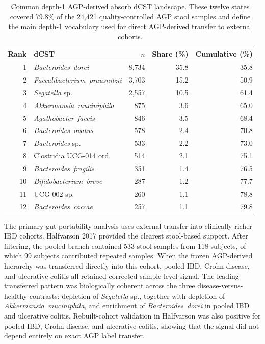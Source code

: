 \documentclass[11pt]{article}
\newcommand{\taxon}[1]{\emph{#1}}
\begin{document}
\begin{table}[H]
\centering
\caption{Common depth-1 AGP-derived absorb dCST landscape. These twelve
states covered 79.8\% of the 24,421 quality-controlled AGP stool samples
and define the main depth-1 vocabulary used for direct AGP-derived
transfer to external cohorts.}
\label{tab:agp-depth1-landscape}
\footnotesize
\renewcommand{\arraystretch}{1.04}
\begin{tabular}{@{} r l r r r @{}}
\toprule
Rank & dCST & $n$ & Share (\%) & Cumulative (\%) \\
\midrule
1 & \taxon{Bacteroides~dorei} & 8,734 & 35.8 & 35.8 \\
2 & \taxon{Faecalibacterium~prausnitzii} & 3,703 & 15.2 & 50.9 \\
3 & \taxon{Segatella} sp. & 2,557 & 10.5 & 61.4 \\
4 & \taxon{Akkermansia~muciniphila} & 875 & 3.6 & 65.0 \\
5 & \taxon{Agathobacter~faecis} & 846 & 3.5 & 68.4 \\
6 & \taxon{Bacteroides~ovatus} & 578 & 2.4 & 70.8 \\
7 & \taxon{Bacteroides} sp. & 533 & 2.2 & 73.0 \\
8 & Clostridia UCG-014 ord. & 514 & 2.1 & 75.1 \\
9 & \taxon{Bacteroides~fragilis} & 351 & 1.4 & 76.5 \\
10 & \taxon{Bifidobacterium~breve} & 287 & 1.2 & 77.7 \\
11 & UCG-002 sp. & 260 & 1.1 & 78.8 \\
12 & \taxon{Bacteroides~caccae} & 257 & 1.1 & 79.8 \\
\bottomrule
\end{tabular}
\end{table}

The primary gut portability analysis uses external transfer into clinically
richer IBD cohorts. Halfvarson 2017 provided the clearest stool-based support. After
filtering, the pooled branch contained 533 stool samples from 118 subjects, of
which 99 subjects contributed repeated samples. When the frozen AGP-derived
hierarchy was transferred directly into this cohort, pooled IBD, Crohn disease,
and ulcerative colitis all retained corrected sample-level signal. The leading
transferred pattern was biologically coherent across the three
disease-versus-healthy contrasts: depletion of \taxon{Segatella} sp., together
with depletion of \taxon{Akkermansia~muciniphila}, and enrichment of
\taxon{Bacteroides~dorei} in pooled IBD and ulcerative colitis. Rebuilt-cohort
validation in Halfvarson was also positive for pooled IBD, Crohn disease, and
ulcerative colitis, showing that the signal did not depend entirely on exact
AGP label transfer.
\end{document}
